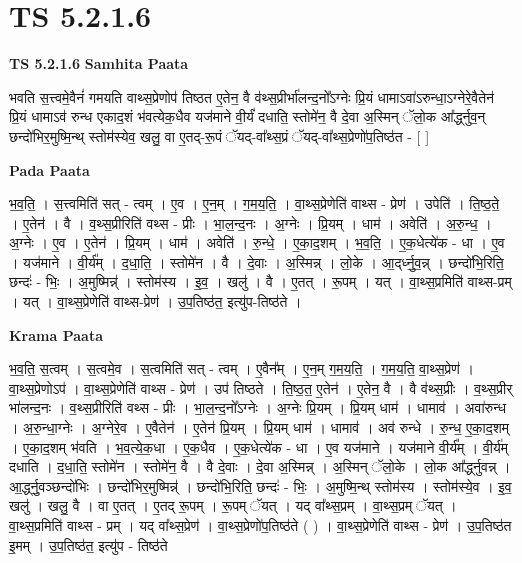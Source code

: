 \documentclass[17pt]{extarticle}
\begin{document}
\section{ TS 5.2.1.6 }

\textbf{TS 5.2.1.6 } \newline
\textbf{Samhita Paata} \newline

भवति स॒त्त्वमे॒वैनं॑ गमयति वाथ्स॒प्रेणोप॑ तिष्ठत ए॒तेन॒ वै व॑थ्स॒प्रीर्भा॑लन्द॒नो᳚ऽग्नेः प्रि॒यं धामाऽवा॑ऽरुन्धा॒ऽग्नेरे॒वैतेन॑ प्रि॒यं धामाऽव॑ रुन्ध एकाद॒शं भ॑वत्येक॒धैव यज॑माने वी॒र्यं॑ दधाति॒ स्तोमे॑न॒ वै दे॒वा अ॒स्मिन् ॅलो॒क आ᳚र्द्ध्नुव॒न् छन्दो॑भिर॒मुष्मि॒न्थ् स्तोम॑स्येव॒ खलु॒ वा ए॒तद्-रू॒पं ॅयद्-वा᳚थ्स॒प्रं ॅयद्-वा᳚थ्स॒प्रेणो॑प॒तिष्ठ॑त - [  ] \newline

\textbf{Pada Paata} \newline

भ॒व॒ति॒ । स॒त्त्वमिति॑ सत् - त्वम् । ए॒व । ए॒न॒म् । ग॒म॒य॒ति॒ । वा॒थ्स॒प्रेणेति॑ वाथ्स - प्रेण॑ । उपेति॑ । ति॒ष्ठ॒ते॒ । ए॒तेन॑ । वै । व॒थ्स॒प्रीरिति॑ वथ्स - प्रीः । भा॒ल॒न्द॒नः । अ॒ग्नेः । प्रि॒यम् । धाम॑ । अवेति॑ । अ॒रु॒न्ध॒ । अ॒ग्नेः । ए॒व । ए॒तेन॑ । प्रि॒यम् । धाम॑ । अवेति॑ । रु॒न्धे॒ । ए॒का॒द॒शम् । भ॒व॒ति॒ । ए॒क॒धेत्ये॑क - धा । ए॒व । यज॑माने । वी॒र्य᳚म् । द॒धा॒ति॒ । स्तोमे॑न । वै । दे॒वाः । अ॒स्मिन्न् । लो॒के । आ॒द्‌र्ध्नु॒व॒न्न् । छन्दो॑भि॒रिति॒ छन्दः॑ - भिः॒ । अ॒मुष्मिन्न्॑ । स्तोम॑स्य । इ॒व॒ । खलु॑ । वै । ए॒तत् । रू॒पम् । यत् । वा॒थ्स॒प्रमिति॑ वाथ्स-प्रम् । यत् । वा॒थ्स॒प्रेणेति॑ वाथ्स-प्रेण॑ । उ॒प॒तिष्ठ॑त॒ इत्यु॑प-तिष्ठ॑ते ।  \newline


\textbf{Krama Paata} \newline

भ॒व॒ति॒ स॒त्वम् । स॒त्वमे॒व । स॒त्वमिति॑ सत् - त्वम् । ए॒वैन᳚म् । ए॒न॒म् ग॒म॒य॒ति॒ । ग॒म॒य॒ति॒ वा॒थ्स॒प्रेण॑ । वा॒थ्स॒प्रेणोऽप॑ । वा॒थ्स॒प्रेणेति॑ वाथ्स - प्रेण॑ । उप॑ तिष्ठते । ति॒ष्ठ॒त॒ ए॒तेन॑ । ए॒तेन॒ वै । वै व॑थ्स॒प्रीः । व॒थ्स॒प्रीर् भा॑लन्द॒नः । व॒थ्स॒प्रीरिति॑ वथ्स - प्रीः । भा॒ल॒न्द॒नो᳚ऽग्नेः । अ॒ग्नेः प्रि॒यम् । प्रि॒यम् धाम॑ । धामाव॑ । अवा॑रुन्ध । अ॒रु॒न्धा॒ग्नेः । अ॒ग्नेरे॒व । ए॒वैतेन॑ । ए॒तेन॑ प्रि॒यम् । प्रि॒यम् धाम॑ । धामाव॑ । अव॑ रुन्धे । रु॒न्ध॒ ए॒का॒द॒शम् । ए॒का॒द॒शम् भ॑वति । भ॒व॒त्ये॒क॒धा । ए॒क॒धैव । ए॒क॒धेत्ये॑क - धा । ए॒व यज॑माने । यज॑माने वी॒र्य᳚म् । वी॒र्य॑म् दधाति । द॒धा॒ति॒ स्तोमे॑न । स्तोमे॑न॒ वै । वै दे॒वाः । दे॒वा अ॒स्मिन्न् । अ॒स्मिन् ॅलो॒के । लो॒क आ᳚र्द्ध्नुवन्न् । आ॒र्द्ध्नु॒वञ्छन्दो॑भिः । छन्दो॑भिर॒मुष्मिन्न्॑ । छन्दो॑भि॒रिति॒ छन्दः॑ - भिः॒ । अ॒मुष्मि॒न्थ् स्तोम॑स्य । स्तोम॑स्ये॒व । इ॒व॒ खलु॑ । खलु॒ वै । वा ए॒तत् । ए॒तद् रू॒पम् । रू॒पम् ॅयत् । यद् वा᳚थ्स॒प्रम् । वा॒थ्स॒प्रम् ॅयत् । वा॒थ्स॒प्रमिति॑ वाथ्स - प्रम् । यद् वा᳚थ्स॒प्रेण॑ । वा॒थ्स॒प्रेणो॑प॒तिष्ठ॑ते ( ) । वा॒थ्स॒प्रेणेति॑ वाथ्स - प्रेण॑ । उ॒प॒तिष्ठ॑त इ॒मम् । उ॒प॒तिष्ठ॑त॒ इत्यु॑प - तिष्ठ॑ते \newline
\end{document}
